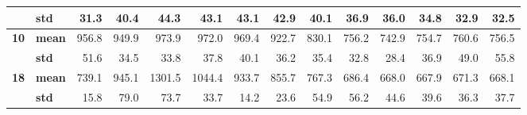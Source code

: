 \begin{table}[htbp]
\begin{tabular}{|c|l|r|r|r|r|r|r|r|r|r|r|r|r|}
\cline{2-14}    \rowcolor[rgb]{ .553,  .706,  .886}      & \textbf{std} & \cellcolor[rgb]{ 1,  1,  1} 31.3 & \cellcolor[rgb]{ 1,  1,  1} 40.4 & \cellcolor[rgb]{ 1,  1,  1} 44.3 & \cellcolor[rgb]{ 1,  1,  1} 43.1 & \cellcolor[rgb]{ 1,  1,  1} 43.1 & \cellcolor[rgb]{ 1,  1,  1} 42.9 & \cellcolor[rgb]{ 1,  1,  1} 40.1 & \cellcolor[rgb]{ 1,  1,  1} 36.9 & \cellcolor[rgb]{ 1,  1,  1} 36.0 & \cellcolor[rgb]{ 1,  1,  1} 34.8 & \cellcolor[rgb]{ 1,  1,  1} 32.9 & \cellcolor[rgb]{ 1,  1,  1} 32.5 \bigstrut\\
    \hline
    \rowcolor[rgb]{ .553,  .706,  .886} \textbf{10} & \textbf{mean} & \cellcolor[rgb]{ .851,  .851,  .851} 956.8 & \cellcolor[rgb]{ .851,  .851,  .851} 949.9 & \cellcolor[rgb]{ .851,  .851,  .851} 973.9 & \cellcolor[rgb]{ .851,  .851,  .851} 972.0 & \cellcolor[rgb]{ .851,  .851,  .851} 969.4 & \cellcolor[rgb]{ .851,  .851,  .851} 922.7 & \cellcolor[rgb]{ .851,  .851,  .851} 830.1 & \cellcolor[rgb]{ .851,  .851,  .851} 756.2 & \cellcolor[rgb]{ .851,  .851,  .851} 742.9 & \cellcolor[rgb]{ .851,  .851,  .851} 754.7 & \cellcolor[rgb]{ .851,  .851,  .851} 760.6 & \cellcolor[rgb]{ .851,  .851,  .851} 756.5 \bigstrut\\
\cline{2-14}    \rowcolor[rgb]{ .553,  .706,  .886}      & \textbf{std} & \cellcolor[rgb]{ .851,  .851,  .851} 51.6 & \cellcolor[rgb]{ .851,  .851,  .851} 34.5 & \cellcolor[rgb]{ .851,  .851,  .851} 33.8 & \cellcolor[rgb]{ .851,  .851,  .851} 37.8 & \cellcolor[rgb]{ .851,  .851,  .851} 40.1 & \cellcolor[rgb]{ .851,  .851,  .851} 36.2 & \cellcolor[rgb]{ .851,  .851,  .851} 35.4 & \cellcolor[rgb]{ .851,  .851,  .851} 32.8 & \cellcolor[rgb]{ .851,  .851,  .851} 28.4 & \cellcolor[rgb]{ .851,  .851,  .851} 36.9 & \cellcolor[rgb]{ .851,  .851,  .851} 49.0 & \cellcolor[rgb]{ .851,  .851,  .851} 55.8 \bigstrut\\
    \hline
    \rowcolor[rgb]{ .553,  .706,  .886} \textbf{18} & \textbf{mean} & \cellcolor[rgb]{ 1,  1,  1} 739.1 & \cellcolor[rgb]{ 1,  1,  1} 945.1 & \cellcolor[rgb]{ 1,  1,  1} 1301.5 & \cellcolor[rgb]{ 1,  1,  1} 1044.4 & \cellcolor[rgb]{ 1,  1,  1} 933.7 & \cellcolor[rgb]{ 1,  1,  1} 855.7 & \cellcolor[rgb]{ 1,  1,  1} 767.3 & \cellcolor[rgb]{ 1,  1,  1} 686.4 & \cellcolor[rgb]{ 1,  1,  1} 668.0 & \cellcolor[rgb]{ 1,  1,  1} 667.9 & \cellcolor[rgb]{ 1,  1,  1} 671.3 & \cellcolor[rgb]{ 1,  1,  1} 668.1 \bigstrut\\
\cline{2-14}    \rowcolor[rgb]{ .553,  .706,  .886}      & \textbf{std} & \cellcolor[rgb]{ 1,  1,  1} 15.8 & \cellcolor[rgb]{ 1,  1,  1} 79.0 & \cellcolor[rgb]{ 1,  1,  1} 73.7 & \cellcolor[rgb]{ 1,  1,  1} 33.7 & \cellcolor[rgb]{ 1,  1,  1} 14.2 & \cellcolor[rgb]{ 1,  1,  1} 23.6 & \cellcolor[rgb]{ 1,  1,  1} 54.9 & \cellcolor[rgb]{ 1,  1,  1} 56.2 & \cellcolor[rgb]{ 1,  1,  1} 44.6 & \cellcolor[rgb]{ 1,  1,  1} 39.6 & \cellcolor[rgb]{ 1,  1,  1} 36.3 & \cellcolor[rgb]{ 1,  1,  1} 37.7 \bigstrut\\

\end{tabular}
\end{table}
